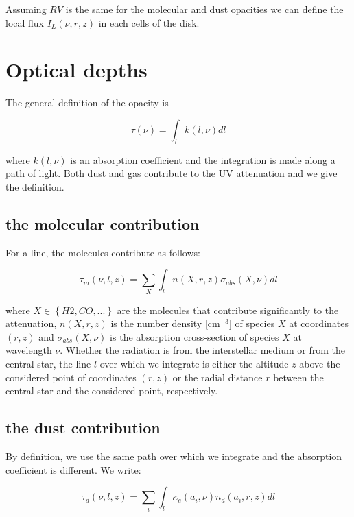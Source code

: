 \documentclass[a4paper]{article}
\begin{document}
\noindent Assuming $RV$ is the same for the molecular and dust opacities we can define the local flux $I_L(\nu, r, z)$ in each cells of the disk. 

\section{Optical depths} %
The general definition of the opacity is

\begin{equation}
\label{eq:tau}%
	\tau(\nu) =  \int_l k(l, \nu)  dl
\end{equation}

\noindent where $k(l, \nu)$ is an absorption coefficient and the integration is made along a path of light. 
\noindent Both dust and gas contribute to the UV attenuation and we give the definition.

\subsection{the molecular contribution} %
For a line, the molecules contribute as follows:

\begin{equation}
\label{eq:tau_m}%
	\tau_m(\nu, l, z) =  \sum_X \int_l n(X, r, z) \sigma_{abs}(X, \nu) dl
\end{equation}

\noindent where $X \in \left\{ H2, CO, ... \right\}$ are the molecules that contribute significantly to the attenuation, $n(X, r,z)$ is the number density [$\mathrm{cm^{-3}}$] of species $X$ at coordinates $(r,z)$ and $\sigma_{abs}(X, \nu)$ is the absorption cross-section of species $X$ at  wavelength $\nu$. Whether the radiation is from the interstellar medium or from the central star, the line $l$ over which we integrate is either the altitude $z$ above the considered point of coordinates $(r,z)$ or the radial distance $r$ between the central star and the considered point, respectively. 

\subsection{the dust contribution}%
By definition, we use the same path over which we integrate and the absorption coefficient is different. We write: 

\begin{equation}
\label{eq:tau_d}%
	\tau_d(\nu, l, z) =  \sum_{i} \int_l \kappa_e(a_i, \nu) n_d(a_i, r,z) dl
\end{equation}
\end{document}
